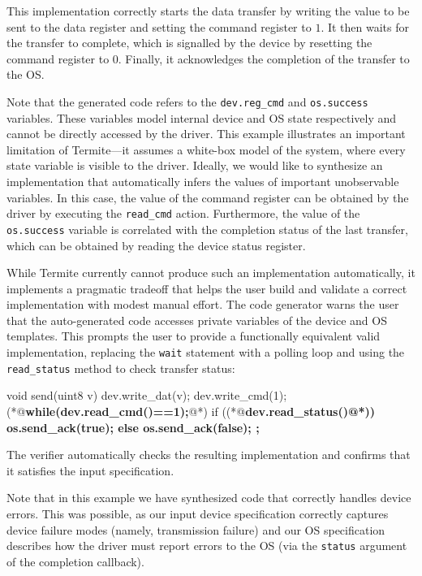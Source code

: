 \documentclass[a4paper,twoside,openright,11pt]{book}
\newcommand{\termite}{Termite\xspace}
\theoremstyle{definition}
\newcommand{\src}[1]{\texttt{\small #1}}
\begin{document}
This implementation correctly starts the data transfer by writing the value to be sent to the data register and setting the command register to $1$.  It then waits for the transfer to complete, which is signalled by the device by resetting the command register to $0$.  Finally, it acknowledges the completion of the transfer to the OS.

Note that the generated code refers to the \src{dev.reg\_cmd} and \src{os.success} variables.  These variables model internal device and OS state respectively and cannot be directly accessed by the driver.  This example illustrates an important limitation of \termite---it assumes a white-box model of the system, where every state variable is visible to the driver.  Ideally, we would like to synthesize an implementation that automatically infers the values of important unobservable variables.  In this case, the value of the command register can be obtained by the driver by executing the \src{read\_cmd} action.  Furthermore, the value of the \src{os.success} variable is correlated with the completion status of the last transfer, which can be obtained by reading the device status register.

While \termite currently cannot produce such an implementation automatically, it implements a pragmatic tradeoff that helps the user build and validate a correct implementation with modest manual effort.  The code generator warns the user that the auto-generated code accesses  private variables of the device and OS templates.  This prompts the user to provide a functionally equivalent valid implementation, replacing the \src{wait} statement with a polling loop and using the \src{read\_status} method to check transfer status:

\begin{tsllisting}[keywords=, frame=single]
void send(uint8 v){
    dev.write_dat(v);
    dev.write_cmd(1);
    (*@{\bf\ttfamily while(dev.read\_cmd()==1){};}@*)
    if ((*@\bf\ttfamily dev.read\_status()@*)) {
        os.send_ack(true);
    } else {
        os.send_ack(false);
    };}
\end{tsllisting}

The verifier automatically checks the resulting implementation and confirms that it satisfies the input specification.

Note that in this example we have synthesized code that correctly handles device errors.  This was possible, as our input device specification correctly captures device failure modes (namely, transmission failure) and our OS specification describes how the driver must report errors to the OS (via the \src{status} argument of the completion callback).
\end{document}
